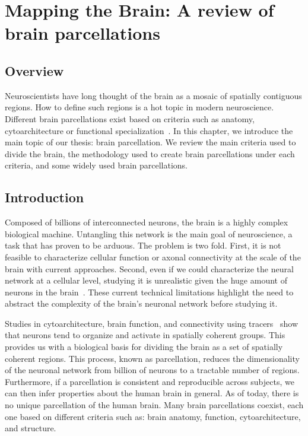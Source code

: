 \chapter{Mapping the Brain: A review of brain parcellations}
\label{ch:brain_mapping}

\section{Overview}
Neuroscientists have long thought of the brain as a mosaic of spatially contiguous
regions. How to define such regions is a hot topic in modern neuroscience.
Different brain parcellations exist based on criteria such as anatomy,
cytoarchitecture or functional specialization~\cite{Brodmann1909, Collins1998, Yeo2011}.
In this chapter, we introduce the main topic of our thesis: brain
parcellation. We review the main criteria used to divide the brain, the methodology
used to create brain parcellations under each criteria, and some widely used
brain parcellations.

\section{Introduction}
Composed of billions of interconnected neurons, the brain is a highly complex
biological machine. Untangling this network is the main goal of
neuroscience, a task that has proven to be arduous. The problem is two fold.
First, it is not feasible to characterize cellular function or axonal
connectivity at the scale of the brain with current approaches. Second, even if
we could characterize the neural network at a cellular level, studying it is
unrealistic given the huge amount of neurons in the brain~\cite{Gong2009}.
These current technical
limitations highlight the need to abstract the complexity of the brain's neuronal
network before studying it.

Studies in cytoarchitecture\cite{Meynert1872, Brodmann1909, VonEconomo1925}, brain
function\cite{Penfield1954, VonderMalsburg1994}, and connectivity using tracers~\cite{Schmahmann2006, Stephan2013}
show that neurons tend to organize and activate in spatially coherent groups.
This provides us with a biological basis for dividing the brain as a set of spatially
coherent regions. This process, known as parcellation, reduces the dimensionality
of the neuronal network from billion of neurons to a tractable number of regions.
Furthermore, if a parcellation is consistent and reproducible across subjects,
we can then infer properties about the human brain in general. As of today,
there is no unique parcellation of the human brain. Many brain parcellations
coexist, each one based on different criteria such as: brain anatomy, 
function, cytoarchitecture, and structure. 

